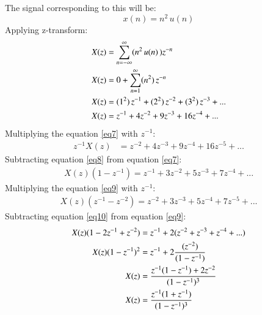 \documentclass[journal,12pt,twocolumn]{IEEEtran}
\theoremstyle{remark}
\begin{document}
The signal corresponding to this will be:
\[x(n)= n^2\,u(n)\]
Applying z-transform:
\begin{align}
X(z)&=\sum_{n=-\infty}^{\infty}(n^2\,u(n)\,)z^{-n}\notag\\
X(z)&=0+ \sum_{n=1}^\infty (n^2)\,z^{-n}\notag\\
X(z)&=(1^2)\,z^{-1}+(2^2)\,z^{-2}+(3^2)\,z^{-3}+...\notag\\
X(z)&=z^{-1}+4z^{-2}+9z^{-3}+16z^{-4}+...\label{eq7}
\end{align}
Multiplying the equation \ref{eq7} with $z^{-1}$:\\
\begin{align}
z^{-1}X(z)&=z^{-2}+4z^{-3}+9z^{-4}+16z^{-5}+...\label{eq8}
\end{align}
Subtracting equation \ref{eq8} from equation \ref{eq7}:
\begin{align}
X(z)(1-z^{-1})=z^{-1}+3z^{-2}+5z^{-3}+7z^{-4}+...\label{eq9}
\end{align}
Multiplying the equation \ref{eq9} with $z^{-1}$:
\begin{align}
X(z)(z^{-1}-z^{-2})=z^{-2}+3z^{-3}+5z^{-4}+7z^{-5}+...\label{eq10}
\end{align}
Subtracting equation \ref{eq10} from equation \ref{eq9}:
\begin{align}
X(z)(1-2z^{-1}+z^{-2})&=z^{-1}+2(z^{-2}+z^{-3}+z^{-4}+...)\notag\\
X(z)(1-z^{-1})^2&=z^{-1}+2\frac{(z^{-2})}{(1-z^{-1})}\notag\\
X(z)&=\frac{z^{-1}(1-z^{-1})+2z^{-2}}{(1-z^{-1})^3}\notag\\
X(z)&=\frac{z^{-1}(1+z^{-1})}{(1-z^{-1})^3}
\end{align}
\end{document}
